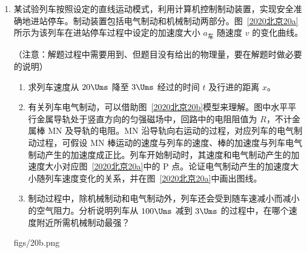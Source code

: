 \documentclass[\gkver]{gaokaozhenti}
\begin{document}
\begin{enumerate}
{（2）设单位长度导线在单位时间内出射电子数为 $n$，金属片上电子形成的电流为 $I$，由电流的定义式得 $I=\frac{Q}{\Delta t}=\frac{nabe\cdot\Delta t}{2\pi R\cdot\Delta t}=\frac{nabe}{2\pi R}$，解得 $n=\frac{2\pi RI}{abe}$；电子流对金属片的压力大小为 $F=pS=pab$，对射到金属片上的电子，由动量定理得 $-pab\cdot\Delta t=-\frac{nab\cdot\Delta t}{2\pi R}\cdot mv$，解得 $v=\frac{peab}{mI}$，故单位长度导线在单位时间内出射电子的总动能为 $E_{k}=\frac{1}{2}mv^{2}\cdot n=\frac{\pi Rp^{2}eab}{mI}$。

}

\item
某试验列车按照设定的直线运动模式，利用计算机控制制动装置，实现安全准确地进站停车。制动装置包括电气制动和机械制动两部分。图~\ref{2020北京20a}所示为该列车在进站停车过程中设定的加速度大小 $a_{\text{车}}$ 随速度 $v$ 的变化曲线。

（注意：解题过程中需要用到、但题目没有给出的物理量，要在解题时做必要的说明）

\begin{enumerate}
	\item
	求列车速度从 $20\Ums$ 降至 $3\Ums$ 经过的时间 $t$ 及行进的距离 $x$。
	\item
	有关列车电气制动，可以借助图~\ref{2020北京20b}模型来理解。图中水平平行金属导轨处于竖直方向的匀强磁场中，回路中的电阻阻值为 $R$，不计金属棒 MN 及导轨的电阻。MN 沿导轨向右运动的过程，对应列车的电气制动过程，可假设 MN 棒运动的速度与列车的速度、棒的加速度与列车电气制动产生的加速度成正比。列车开始制动时，其速度和电气制动产生的加速度大小对应图~\ref{2020北京20a}中的 P 点。论证电气制动产生的加速度大小随列车速度变化的关系，并在图~\ref{2020北京20a}中画出图线。
	\item
	制动过程中，除机械制动和电气制动外，列车还会受到随车速减小而减小的空气阻力。分析说明列车从 $100\Ums$ 减到 $3\Ums$ 的过程中，在哪个速度附近所需机械制动最强？
\end{enumerate}

{figs/20b.png}

\end{enumerate}
\end{document}
